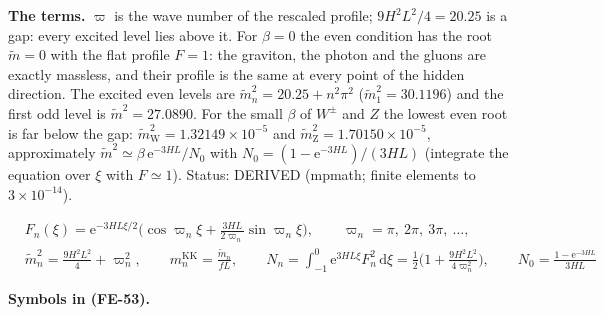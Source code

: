 \documentclass[
  10pt,
]{article}
\begin{document}
\textbf{The terms.} \(\varpi\) is the wave number of the rescaled
profile; \(9H^2L^2/4 = 20.25\) is a gap: every excited level lies above
it. For \(\beta = 0\) the even condition has the root \(\tilde m = 0\)
with the flat profile \(F = 1\): the graviton, the photon and the gluons
are exactly massless, and their profile is the same at every point of
the hidden direction. The excited even levels are
\(\tilde m_n^2 = 20.25 + n^2\pi^2\) (\(\tilde m_1^2 = 30.1196\)) and the
first odd level is \(\tilde m^2 = 27.0890\). For the small \(\beta\) of
\(W^\pm\) and \(Z\) the lowest even root is far below the gap:
\(\tilde m_{\mathrm{W}}^2 = 1.32149\times10^{-5}\) and
\(\tilde m_{\mathrm{Z}}^2 = 1.70150\times10^{-5}\), approximately
\(\tilde m^2 \simeq \beta\,\mathrm{e}^{-3HL}/N_0\) with
\(N_0 = (1 - \mathrm{e}^{-3HL})/(3HL)\) (integrate the equation over
\(\xi\) with \(F \simeq 1\)). Status: DERIVED (mpmath; finite elements
to \(3\times10^{-14}\)).

\[
\begin{aligned}
&F_n(\xi) = \mathrm{e}^{-3HL\xi/2}\Big(\cos\varpi_n\xi + \frac{3HL}{2\varpi_n}\sin\varpi_n\xi\Big),\qquad
 \varpi_n = \pi,\ 2\pi,\ 3\pi,\ \dots,\\
&\tilde m_n^2 = \frac{9H^2L^2}{4} + \varpi_n^2,\qquad m^{\mathrm{KK}}_n = \frac{\tilde m_n}{fL},\qquad
 N_n = \int_{-1}^{0}\mathrm{e}^{3HL\xi}F_n^2\,\mathrm{d}\xi = \frac12\Big(1 +
 \frac{9H^2L^2}{4\varpi_n^2}\Big),\qquad
 N_0 = \frac{1 - \mathrm{e}^{-3HL}}{3HL}
\end{aligned} \tag{FE-53}
\]

\textbf{Symbols in (FE-53).}
\end{document}
